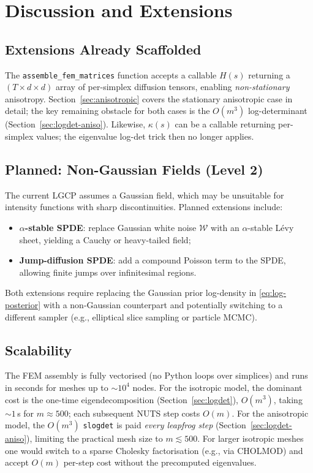 \documentclass[11pt]{article}
\begin{document}
\section{Discussion and Extensions}

\subsection{Extensions Already Scaffolded}

The \texttt{assemble\_fem\_matrices} function accepts a callable $H(s)$
returning a $(T \times d \times d)$ array of per-simplex diffusion tensors,
enabling \emph{non-stationary} anisotropy.  Section~\ref{sec:anisotropic}
covers the stationary anisotropic case in detail; the key remaining obstacle
for both cases is the $O(m^3)$ log-determinant (Section~\ref{sec:logdet-aniso}).
Likewise, $\kappa(s)$ can be a callable returning per-simplex values; the
eigenvalue log-det trick then no longer applies.

\subsection{Planned: Non-Gaussian Fields (Level 2)}

The current LGCP assumes a Gaussian field, which may be unsuitable for intensity
functions with sharp discontinuities.  Planned extensions include:
\begin{itemize}
  \item \textbf{$\alpha$-stable SPDE}: replace Gaussian white noise $\mathcal{W}$
    with an $\alpha$-stable L\'evy sheet, yielding a Cauchy or heavy-tailed field;
  \item \textbf{Jump-diffusion SPDE}: add a compound Poisson term to the SPDE,
    allowing finite jumps over infinitesimal regions.
\end{itemize}

Both extensions require replacing the Gaussian prior log-density in
\eqref{eq:log-posterior} with a non-Gaussian counterpart and potentially
switching to a different sampler (e.g., elliptical slice sampling or particle
MCMC).

\subsection{Scalability}

The FEM assembly is fully vectorised (no Python loops over simplices) and runs
in seconds for meshes up to $\sim 10^4$ nodes.  For the isotropic model, the
dominant cost is the one-time eigendecomposition (Section~\ref{sec:logdet}),
$O(m^3)$, taking $\sim 1$\,s for $m \approx 500$; each subsequent NUTS step
costs $O(m)$.  For the anisotropic model, the $O(m^3)$ \texttt{slogdet} is paid
\emph{every leapfrog step} (Section~\ref{sec:logdet-aniso}), limiting the
practical mesh size to $m \lesssim 500$.  For larger isotropic meshes one would
switch to a sparse Cholesky factorisation (e.g., via \textsc{CHOLMOD}) and
accept $O(m)$ per-step cost without the precomputed eigenvalues.
\end{document}

